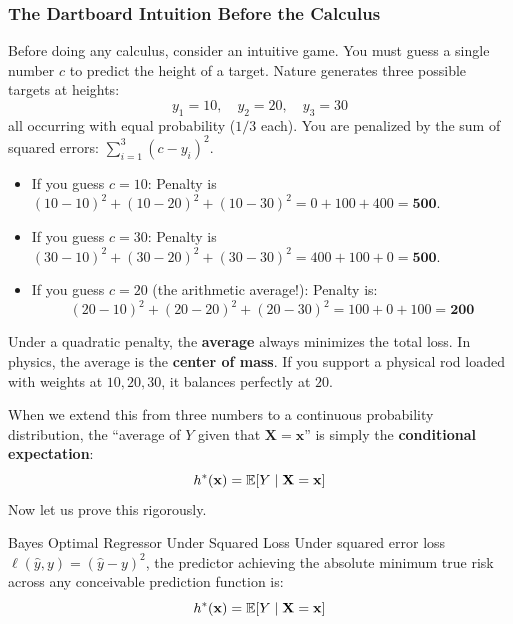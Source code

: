 \subsubsection{The Dartboard Intuition Before the Calculus}
Before doing any calculus, consider an intuitive game. You must guess a single number $c$ to predict the height of a target. Nature generates three possible targets at heights:
\begin{equation*}
y_1 = 10, \quad y_2 = 20, \quad y_3 = 30
\end{equation*}
all occurring with equal probability ($1/3$ each). You are penalized by the sum of squared errors: $\sum_{i=1}^3 (c - y_i)^2$.
\begin{itemize}
    \item If you guess $c = 10$: Penalty is $(10 - 10)^2 + (10 - 20)^2 + (10 - 30)^2 = 0 + 100 + 400 = \mathbf{500}$.
    \item If you guess $c = 30$: Penalty is $(30 - 10)^2 + (30 - 20)^2 + (30 - 30)^2 = 400 + 100 + 0 = \mathbf{500}$.
    \item If you guess $c = 20$ (the arithmetic average!): Penalty is:
    \begin{equation*}
    (20 - 10)^2 + (20 - 20)^2 + (20 - 30)^2 = 100 + 0 + 100 = \mathbf{200}
    \end{equation*}
\end{itemize}
Under a quadratic penalty, the \textbf{average} always minimizes the total loss. In physics, the average is the \textbf{center of mass}. If you support a physical rod loaded with weights at $10, 20, 30$, it balances perfectly at $20$.

When we extend this from three numbers to a continuous probability distribution, the ``average of $Y$ given that $\mathbf{X} = \mathbf{x}$'' is simply the \textbf{conditional expectation}:
\begin{equation}
h^*(\mathbf{x}) = \operatorname{\mathbb{E}}[Y \mid \mathbf{X} = \mathbf{x}]
\end{equation}
Now let us prove this rigorously.

\begin{theorembox}{Bayes Optimal Regressor Under Squared Loss}
Under squared error loss $\ell(\hat{y}, y) = (\hat{y} - y)^2$, the predictor achieving the absolute minimum true risk across any conceivable prediction function is:
\begin{equation}
h^*(\mathbf{x}) = \operatorname{\mathbb{E}}[Y \mid \mathbf{X} = \mathbf{x}]
\label{eq:bayes_regressor_proof_target_ped}
\end{equation}
\end{theorembox}

